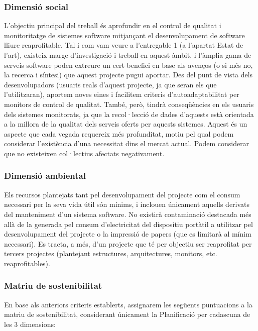 \subsubsection{Dimensió social}

L’objectiu principal del treball és aprofundir en el control de qualitat i monitoritatge de sistemes software mitjançant el desenvolupament de software lliure reaprofitable. Tal i com vam veure a l’entregable 1 (a l’apartat Estat de l’art), existeix marge d’investigació i treball en aquest àmbit, i l’àmplia gama de serveis software poden extreure un cert benefici en base als avenços (o si més no, la recerca i síntesi) que aquest projecte pugui aportar. Des del punt de vista dels desenvolupadors (usuaris reals d’aquest projecte, ja que seran els que l’utilitzaran), aportem noves eines i facilitem criteris d’autoadaptabilitat per monitors de control de qualitat. També, però, tindrà conseqüències en els usuaris dels sistemes monitorats, ja que la recol·lecció de dades d’aquests està orientada a la millora de la qualitat dels serveis oferts per aquests sistemes. Aquest és un aspecte que cada vegada requereix més profunditat, motiu pel qual podem considerar l’existència d’una necessitat dins el mercat actual. Podem considerar que no existeixen col·lectius afectats negativament.

\subsubsection{Dimensió ambiental}

Els recursos plantejats tant pel desenvolupament del projecte com el consum necessari per la seva vida útil són mínims, i inclouen únicament aquells derivats del manteniment d’un sistema software. No existirà contaminació destacada més allà de la generada pel consum d’electricitat del dispositiu portàtil a utilitzar pel desenvolupament del projecte o la impressió de papers (que es limitarà al mínim necessari). Es tracta, a més, d’un projecte que té per objectiu ser reaprofitat per tercers projectes (plantejant estructures, arquitectures, monitors, etc. reaprofitables).

\subsubsection{Matriu de sostenibilitat}
En base als anteriors criteris establerts, assignarem les següents puntuacions a la matriu de sostenibilitat, considerant únicament la Planificació per cadascuna de les 3 dimensions:

